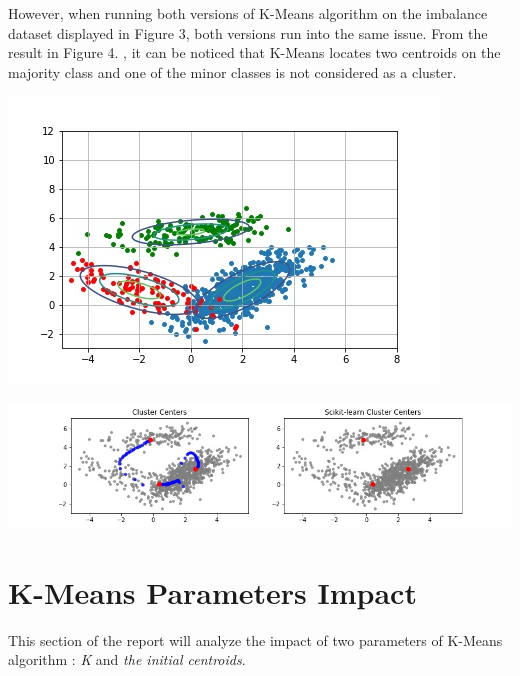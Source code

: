 \documentclass{article}
\begin{document}
However, when running both versions of K-Means algorithm on the imbalance dataset displayed in Figure 3, both versions run into the same issue. From the result in Figure 4. , it can be noticed that K-Means locates two centroids on the majority class and one of the minor classes is not considered as a cluster.
\begin{center}
\includegraphics[scale=0.3]{distribution-imbalance}
\end{center}
\begin{center}
\includegraphics[scale=0.4]{sklean-compare-imbalance}
\end{center}

\section{K-Means Parameters Impact}
This section of the report will analyze the impact of two parameters of K-Means algorithm : \textit{K} and \textit{the initial centroids}.
\end{document}
